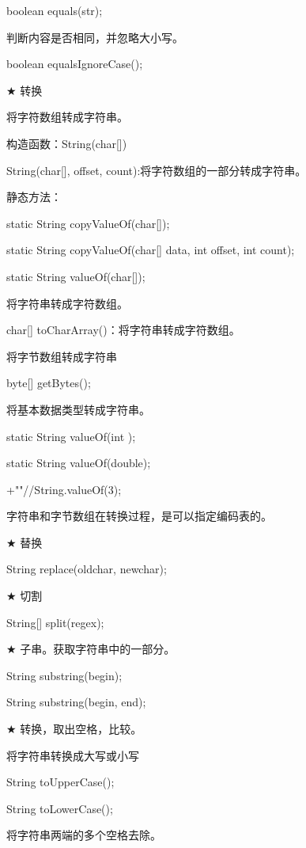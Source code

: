 \documentclass[UTF8]{ctexart}
\begin{document}
\qquad \quad boolean equals(str);

\qquad \textbullet 判断内容是否相同，并忽略大小写。

\qquad \quad boolean equalsIgnoreCase();

$\bigstar$ 转换

\qquad \textbullet 将字符数组转成字符串。

\qquad \quad 构造函数：String(char[])

\qquad \qquad \quad String(char[], offset, count):将字符数组的一部分转成字符串。

\qquad \quad 静态方法：

\qquad \qquad \quad static String copyValueOf(char[]);

\qquad \qquad \quad static String copyValueOf(char[] data, int offset, int count);

\qquad \qquad \quad static String valueOf(char[]);

\qquad \textbullet 将字符串转成字符数组。

\qquad \quad char[] toCharArray()：将字符串转成字符数组。

\qquad \textbullet 将字节数组转成字符串

\qquad \quad byte[] getBytes();

\qquad \textbullet 将基本数据类型转成字符串。

\qquad \quad static String valueOf(int );

\qquad \quad static String valueOf(double);

\qquad {}+""//String.valueOf(3);

\qquad \quad 字符串和字节数组在转换过程，是可以指定编码表的。

$\bigstar$ 替换

\qquad \quad String replace(oldchar, newchar);

$\bigstar$ 切割

\qquad \quad String[] split(regex);

$\bigstar$ 子串。获取字符串中的一部分。

\qquad \quad String substring(begin);

\qquad \quad String substring(begin, end);

$\bigstar$ 转换，取出空格，比较。

\qquad \textbullet 将字符串转换成大写或小写

\qquad \quad String toUpperCase();

\qquad \quad String toLowerCase();

\qquad \textbullet 将字符串两端的多个空格去除。
\end{document}
